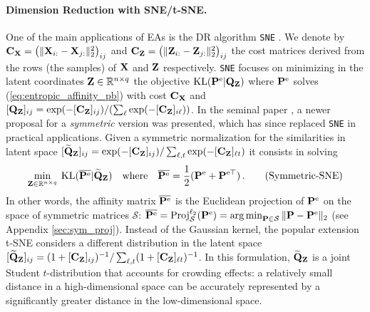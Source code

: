 \paragraph{Dimension Reduction with SNE/t-SNE.} One of the main applications of EAs
is the DR algorithm \texttt{SNE} \cite{hinton2002stochastic}. We
denote by $\mathbf{C}_{\mathbf{X}} = \left(\|\mathbf{X}_{i:}-\mathbf{X}_{j:}\|_2^2\right)_{ij}$ and $\mathbf{C}_{\mathbf{Z}} =
\left(\|\mathbf{Z}_{i:}-\mathbf{Z}_{j:}\|_2^2\right)_{ij}$ the cost matrices derived from the
rows (\ie the samples) of $\mathbf{X}$ and $\mathbf{Z}$ respectively. \texttt{SNE} focuses on
minimizing in the latent coordinates $\mathbf{Z} \in \mathbb{R}^{n \times q}$ the objective
$\operatorname{KL}(\mathbf{P}^\mathrm{e} | \mathbf{Q}_{\mathbf{Z}})$ where $\mathbf{P}^\mathrm{e}$ solves
(\ref{eq:entropic_affinity_pb}) with cost $\mathbf{C}_{\mathbf{X}}$ and $[\mathbf{Q}_{\mathbf{Z}}]_{ij} = \exp(-[\mathbf{C}_{\mathbf{Z}}]_{ij})/(\sum_{\ell}\exp(-[\mathbf{C}_{\mathbf{Z}}]_{i\ell}))$. In the seminal paper \citep{van2008visualizing}, a newer proposal for a \emph{symmetric} version was presented, which has since replaced \texttt{SNE} in practical applications. Given a symmetric
normalization for the similarities in latent space $[\widetilde{\mathbf{Q}}_{\mathbf{Z}}]_{ij} = \exp(-[\mathbf{C}_{\mathbf{Z}}]_{ij})/\sum_{\ell,t}\exp(-[\mathbf{C}_{\mathbf{Z}}]_{\ell t})$ it consists in solving 
\begin{align}\label{symmetrization_tsne}
    \min_{\mathbf{Z} \in \mathbb{R}^{n \times q}} \: \operatorname{KL}(\overline{\mathbf{P}^{\mathrm{e}}} | \widetilde{\mathbf{Q}}_{\mathbf{Z}}) \quad \text{where} \quad \overline{\mathbf{P}^{\mathrm{e}}} = \frac{1}{2}(\mathbf{P}^{\mathrm{e}} + \mathbf{P}^{\mathrm{e} \top}) \,.
\tag{Symmetric-SNE}
\end{align}
In other words, the affinity matrix $\overline{\mathbf{P}^{\mathrm{e}}}$ is the Euclidean projection of $\mathbf{P}^{\mathrm{e}}$ on the space of symmetric matrices $\mathcal{S}$: $\overline{\mathbf{P}^{\mathrm{e}}} = \operatorname{Proj}^{\ell_2}_{\mathcal{S}}(\mathbf{P}^{\mathrm{e}}) = \operatorname*{arg\,min}_{\mathbf{P} \in \mathcal{S}}\| \mathbf{P} - \mathbf{P}^{\mathrm{e}} \|_2$ (see Appendix \ref{sec:sym_proj}). Instead of the Gaussian kernel, the popular extension t-SNE \citep{van2008visualizing} considers a different distribution in the latent space $[\widetilde{\mathbf{Q}}_{\mathbf{Z}}]_{ij} = (1 + [\mathbf{C}_{\mathbf{Z}}]_{ij})^{-1}/\sum_{\ell,t}(1 +
[\mathbf{C}_{\mathbf{Z}}]_{\ell t})^{-1}$. In this formulation, $\widetilde{\mathbf{Q}}_{\mathbf{Z}}$ is a joint
Student $t$-distribution that accounts for crowding effects: a relatively small
distance in a high-dimensional space can be accurately represented by a
significantly greater distance in the low-dimensional space.  

